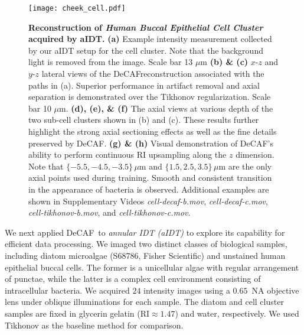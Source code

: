 \documentclass[11pt]{article}
\theoremstyle{plain} %
\def\proposed{DeCAF}
\begin{document}
\begin{figure}[t!]
\begin{center}
\texttt{[image: cheek\_cell.pdf]}
\end{center}
\caption{
\textbf{Reconstruction of \emph{Human Buccal Epithelial Cell Cluster} acquired by aIDT.} 
\textbf{(a)} Example intensity measurement collected by our aIDT setup for the cell cluster. Note that the background light is removed from the image. Scale bar 13 $\mu$m
\textbf{(b) \& (c)} $x$-$z$ and $y$-$z$ lateral views of the \proposed reconstruction associated with the paths in (a). Superior performance in artifact removal and axial separation is demonstrated over the Tikhonov regularization. Scale bar 10 $\mu$m.
\textbf{(d), (e), \& (f)} The axial views at various depth of the two sub-cell clusters shown in (b) and (c). These results further highlight the strong axial sectioning effects as well as the fine details preserved by \proposed.
\textbf{(g) \& (h)} Visual demonstration of \proposed's ability to perform continuous RI upsampling along the $z$ dimension. 
Note that $\{-5.5, -4.5, -3.5\}\,\mu$m and $\{1.5, 2.5, 3.5\}\,\mu$m are the only axial points used during training.
Smooth and consistent transition in the appearance of bacteria is observed. 
Additional examples are shown in Supplementary Videos \emph{cell-decaf-b.mov}, \emph{cell-decaf-c.mov}, \emph{cell-tikhonov-b.mov}, and \emph{cell-tikhonov-c.mov}.
}
\label{Fig:cells}
\end{figure}

We next applied \proposed~to \emph{annular IDT (aIDT)} to explore its capability for efficient data processing. We imaged two distinct classes of biological samples, including diatom microalgae (S68786, Fisher Scientific) and unstained human epithelial buccal cells.
The former is a unicellular algae with regular arrangement of punctae, while the latter is a complex cell environment consisting of intracellular bacteria.
We acquired $24$ intensity images using a $0.65$~NA objective lens under oblique illuminations for each sample.
The diatom and cell cluster samples are fixed in glycerin gelatin ($\text{RI}\approx1.47$) and water, respectively.
We used Tikhonov as the baseline method for comparison. 
\end{document}

